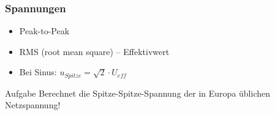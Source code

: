 \begin{frame}
  \frametitle{Spannungen}
  \begin{center}
    \begin{itemize}
      \item Peak-to-Peak
      \item RMS (root mean square) -- Effektivwert
      \item Bei Sinus: $u_{Spitze} = \sqrt{2} \cdot U_{eff}$ \\
    \end{itemize}
  \end{center}
  \begin{exampleblock}{Aufgabe}
    Berechnet die Spitze-Spitze-Spannung der in Europa üblichen Netzspannung!
  \end{exampleblock}
\end{frame}

